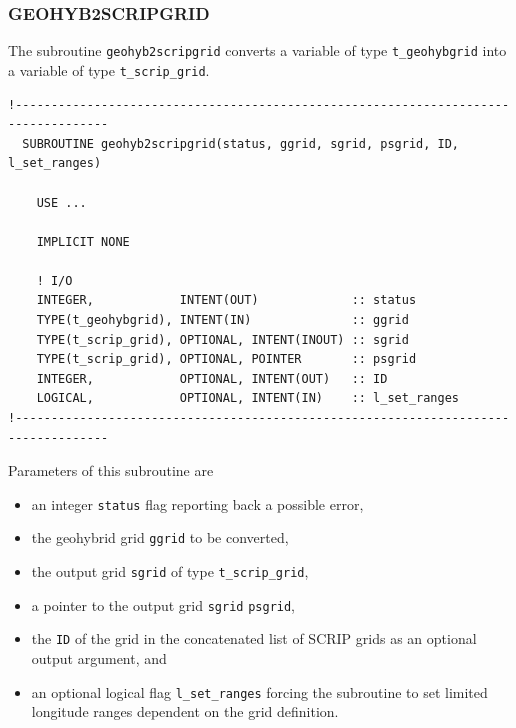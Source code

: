 \documentclass[11pt,twoside]{article}
\begin{document}
\subsubsection{GEOHYB2SCRIPGRID\label{GH2SG}}
The subroutine \verb|geohyb2scripgrid| converts a variable of
type \verb|t_geohybgrid| into a variable of type \verb|t_scrip_grid|.

\begin{verbatim}
!-----------------------------------------------------------------------------------
  SUBROUTINE geohyb2scripgrid(status, ggrid, sgrid, psgrid, ID, l_set_ranges)

    USE ...

    IMPLICIT NONE
    
    ! I/O
    INTEGER,            INTENT(OUT)             :: status
    TYPE(t_geohybgrid), INTENT(IN)              :: ggrid
    TYPE(t_scrip_grid), OPTIONAL, INTENT(INOUT) :: sgrid
    TYPE(t_scrip_grid), OPTIONAL, POINTER       :: psgrid
    INTEGER,            OPTIONAL, INTENT(OUT)   :: ID
    LOGICAL,            OPTIONAL, INTENT(IN)    :: l_set_ranges
!-----------------------------------------------------------------------------------
\end{verbatim}
Parameters of this  subroutine are
\begin{itemize}
\item an integer \verb|status| flag reporting back a possible error,
\item the geohybrid grid \verb|ggrid| to be converted,
\item the output grid \verb|sgrid| of type \verb|t_scrip_grid|,
\item a pointer to the output grid  \verb|sgrid|  \verb|psgrid|,
\item the \verb|ID| of the grid in the concatenated list of SCRIP
grids as an optional output argument, and
\item an optional logical flag \verb|l_set_ranges| forcing the
subroutine to set limited longitude ranges dependent on the grid definition.
\end{itemize}
\end{document}
